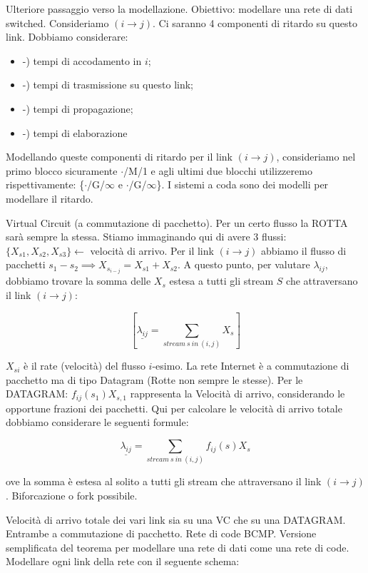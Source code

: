 Ulteriore passaggio verso la modellazione. Obiettivo: modellare una rete di dati switched. Consideriamo $(i\rightarrow j)$. Ci saranno 4 componenti di ritardo su questo link. Dobbiamo considerare:

\begin{itemize}

\item{-)} tempi di accodamento in $i$;
\item{-)} tempi di trasmissione su questo link;
\item{-)} tempi di propagazione;
\item{-)} tempi di elaborazione

\end{itemize}

Modellando queste componenti di ritardo per il link $(i\rightarrow j)$, consideriamo nel primo blocco sicuramente $\mathord{\cdot}$/M/1 e agli ultimi due blocchi utilizzeremo rispettivamente: \{$\mathord{\cdot}$/G/$\infty$ e $\mathord{\cdot}$/G/$\infty$\}.
I sistemi a coda sono dei modelli per modellare il ritardo.

Virtual Circuit (a commutazione di pacchetto). Per un certo flusso la ROTTA sarà sempre la stessa. Stiamo immaginando qui di avere 3 flussi: $\{X_{s1}, X_{s2}, X_{s3}\} \leftarrow$ velocità di arrivo. Per il link $(i\rightarrow j)$ abbiamo il flusso di pacchetti $s_1-s_2 \implies X_{s_{i-j}} = X_{s1}+X_{s2}$. A questo punto, per valutare $\lambda_{ij}$, dobbiamo trovare la somma delle $X_s$ estesa a tutti gli stream $S$ che attraversano il link $(i\rightarrow j)$:

\[
	[\underline{\lambda_{ij}} = \sum_{stream\ s\ in\ (i,j)}{X_s}]
\]

$X_{si}$ è il rate (velocità) del flusso $i$-esimo. La rete Internet è a commutazione di pacchetto ma di tipo Datagram (Rotte non sempre le stesse). Per le DATAGRAM: $f_{ij}(s_1)X_{s,1}$ rappresenta la Velocità di arrivo, considerando le opportune frazioni dei pacchetti. Qui per calcolare le velocità di arrivo totale dobbiamo considerare le seguenti formule:

\[	
	\underline{\lambda_{ij}} = \sum_{stream\ s\ in\ (i,j)}{f_{ij}(s)X_s}
\]

ove la somma è estesa al solito a tutti gli stream che attraversano il link $(i\rightarrow j)$. Biforcazione o fork possibile.

Velocità di arrivo totale dei vari link sia su una VC che su una DATAGRAM. Entrambe a commutazione di pacchetto. Rete di code BCMP. Versione semplificata del teorema per modellare una rete di dati come una rete di code. Modellare ogni link della rete con il seguente schema:




